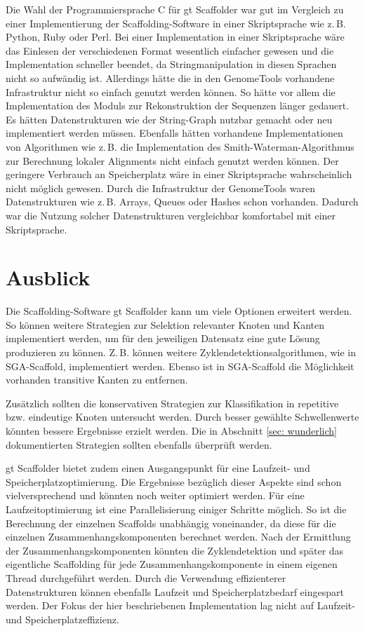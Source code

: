 \documentclass[a4paper,11pt,parskip]{scrartcl}
\begin{document}
Die Wahl der Programmiersprache C für gt Scaffolder war gut im
Vergleich zu einer Implementierung der Scaffolding-Software in einer
Skriptsprache wie z.\,B. Python, Ruby oder Perl. Bei einer
Implementation in einer Skriptsprache wäre das Einlesen der
verschiedenen Format wesentlich einfacher gewesen und die
Implementation schneller beendet, da Stringmanipulation in diesen
Sprachen nicht so aufwändig ist. Allerdings hätte die in den
GenomeTools vorhandene Infrastruktur nicht so einfach genutzt werden
können. So hätte vor allem die Implementation des Moduls zur
Rekonstruktion der Sequenzen länger gedauert. Es hätten
Datenstrukturen wie der String-Graph nutzbar gemacht oder neu
implementiert werden müssen. Ebenfalls hätten vorhandene
Implementationen von Algorithmen wie z.\,B. die Implementation des
Smith-Waterman-Algorithmus zur Berechnung lokaler Alignments nicht
einfach genutzt werden können. Der geringere Verbrauch an
Speicherplatz wäre in einer Skriptsprache wahrscheinlich nicht möglich
gewesen. Durch die Infrastruktur der GenomeTools waren Datenstrukturen
wie z.\,B. Arrays, Queues oder Hashes schon vorhanden. Dadurch war die
Nutzung solcher Datenstrukturen vergleichbar komfortabel mit einer
Skriptsprache.

\section{Ausblick}
\label{sec: Ausblick}

Die Scaffolding-Software gt Scaffolder kann um viele Optionen
erweitert werden. So können weitere Strategien zur Selektion
relevanter Knoten und Kanten implementiert werden, um für den
jeweiligen Datensatz eine gute Lösung produzieren zu
können. Z.\,B. können weitere Zyklendetektionsalgorithmen, wie in
SGA-Scaffold, implementiert werden. Ebenso ist in SGA-Scaffold die
Möglichkeit vorhanden transitive Kanten zu entfernen.

Zusätzlich sollten die konservativen Strategien zur Klassifikation in
repetitive bzw. eindeutige Knoten untersucht werden. Durch besser
gewählte Schwellenwerte könnten bessere Ergebnisse erzielt werden. Die
in Abschnitt \ref{sec: wunderlich} dokumentierten Strategien sollten
ebenfalls überprüft werden.

gt Scaffolder bietet zudem einen Ausgangspunkt für eine Laufzeit- und
Speicherplatzoptimierung. Die Ergebnisse bezüglich dieser Aspekte sind
schon vielversprechend und könnten noch weiter optimiert werden. Für
eine Laufzeitoptimierung ist eine Parallelisierung einiger Schritte
möglich. So ist die Berechnung der einzelnen Scaffolds unabhängig
voneinander, da diese für die einzelnen Zusammenhangskomponenten
berechnet werden. Nach der Ermittlung der Zusammenhangskomponenten
könnten die Zyklendetektion und später das eigentliche Scaffolding für
jede Zusammenhangskomponente in einem eigenen Thread durchgeführt
werden. Durch die Verwendung effizienterer Datenstrukturen können
ebenfalls Laufzeit und Speicherplatzbedarf eingespart werden. Der
Fokus der hier beschriebenen Implementation lag nicht auf Laufzeit-
und Speicherplatzeffizienz.
\end{document}
